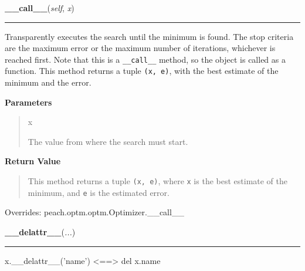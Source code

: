    \vspace{0.5ex}

    \begin{boxedminipage}{\textwidth}

    \raggedright \textbf{\_\_call\_\_}(\textit{self}, \textit{x})

    \vspace{-1.5ex}

    \rule{\textwidth}{0.5\fboxrule}

Transparently executes the search until the minimum is found. The stop
criteria are the maximum error or the maximum number of iterations,
whichever is reached first. Note that this is a \texttt{{\_}{\_}call{\_}{\_}} method, so
the object is called as a function. This method returns a tuple
\texttt{(x, e)}, with the best estimate of the minimum and the error.
    \vspace{1ex}

      \textbf{Parameters}
      \begin{quote}
        \begin{Ventry}{x}

          \item[x]


The value from where the search must start.
        \end{Ventry}

      \end{quote}

    \vspace{1ex}

      \textbf{Return Value}
      \begin{quote}

This method returns a tuple \texttt{(x, e)}, where \texttt{x} is the best
estimate of the minimum, and \texttt{e} is the estimated error.
      \end{quote}

    \vspace{1ex}

      Overrides: peach.optm.optm.Optimizer.\_\_call\_\_

    \end{boxedminipage}

    \label{object:__delattr__}

    \vspace{0.5ex}

    \begin{boxedminipage}{\textwidth}

    \raggedright \textbf{\_\_delattr\_\_}(\textit{...})

    \vspace{-1.5ex}

    \rule{\textwidth}{0.5\fboxrule}

x.{\_}{\_}delattr{\_}{\_}('name') {\textless}=={\textgreater} del x.name
    \vspace{1ex}

    \end{boxedminipage}

